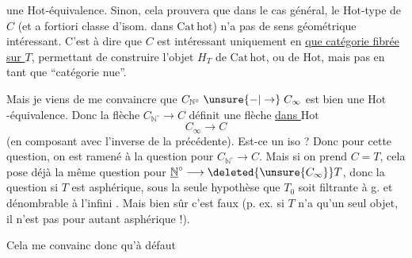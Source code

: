 une $\mathrm{Hot}$-équivalence. Sinon, cela prouvera que dans le cas général, le  $\mathrm{Hot}$-type de $C$ (et a fortiori  classe d'isom. dans $\mathrm{Cat\,hot}$) n'a pas de sens géométrique intéressant.  C'est à dire que $C$ est intéressant uniquement en \uline{ que catégorie fibrée sur $T$}, permettant  de construire l'objet $H_T$ de $\mathrm{Cat\,hot}$, ou de $\mathrm{Hot}$, mais pas en tant que ``catégorie nue''.

Mais je viens de me convaincre que $C_{\mathbb N^\circ}\mathrel{\unsure{-|\to}}C_\infty$ est bien une $\mathrm{Hot}$-équivalence. Donc la flèche $C_{\mathbb N^\circ}\longrightarrow C$ définit une flèche \uline{dans $\mathrm{Hot}$}
\[
C_\infty\longrightarrow C
\]
(en composant avec l'inverse  de la précédente). Est-ce un iso ? Donc pour cette question, on est ramené à la question pour $C_{\mathbb N^\circ}\longrightarrow C$. Mais si on prend $C=T$, cela pose déjà la même question pour $\underline{\mathbb N}^\circ\longrightarrow\deleted{\unsure{C_\infty}}T$, donc la question si $T$ est asphérique, sous la seule hypothèse que $T_0$ soit filtrante à g. et dénombrable à l'infini . Mais bien sûr c'est faux (p. ex. si $T$ n'a qu'un seul objet, il n'est pas pour autant asphérique !).

Cela me convainc donc qu'à défaut
